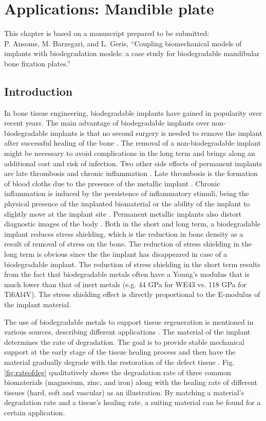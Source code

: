 \chapter{Applications: Mandible plate}\label{ch:mandible}

\begin{shaded}
This chapter is based on a manuscript prepared to be submitted:\\
P. Ansoms, M. Barzegari, and L. Geris, ``Coupling biomechanical models of implants with biodegradation models: a case study for biodegradable mandibular bone fixation plates.''
\end{shaded}

\section{Introduction}

In bone tissue engineering, biodegradable implants have gained in popularity over recent years. The main advantage of biodegradable implants over non-biodegradable implants is that no second surgery is needed to remove the implant after successful healing of the bone \cite{Zheng2014}. The removal of a non-biodegradable implant might be necessary to avoid complications in the long term and brings along an additional cost and risk of infection. Two other side effects of permanent implants are late thrombosis and chronic inflammation \cite{KChen}. Late thrombosis is the formation of blood cloths due to the presence of the metallic implant \cite{thrombosis}. Chronic inflammation is induced by the persistence of inflammatory stimuli, being the physical presence of the implanted biomaterial or the ability of the implant to slightly move at the implant site \cite{inflammation}. Permanent metallic implants also distort diagnostic images of the body \cite{Han}. Both in the short and long term, a biodegradable implant reduces stress shielding, which is the reduction in bone density as a result of removal of stress on the bone. The reduction of stress shielding in the long term is obvious since the the implant has disappeared in case of a biodegradable implant. The reduction of stress shielding in the short term results from the fact that biodegradable metals often have a Young's modulus that is much lower than that of inert metals (e.g. 44 GPa for WE43 vs. 118 GPa for Ti6Al4V). The stress shielding effect is directly proportional to the E-modulus of the implant material.

The use of biodegradable metals to support tissue regeneration is mentioned in various sources, describing different applications \cite{KChen,JChen,Yang}. The material of the implant determines the rate of degradation. The goal is to provide stable mechanical support at the early stage of the tissue healing process and then have the material gradually degrade with the restoration of the defect tissue \cite{Yang}. Fig. \ref{fig:rateofdeg} qualitatively shows the degradation rate of three common biomaterials (magnesium, zinc, and iron) along with the healing rate of different tissues (hard, soft and vascular) as an illustration. By matching a material's degradation rate and a tissue's healing rate, a suiting material can be found for a certain application.

